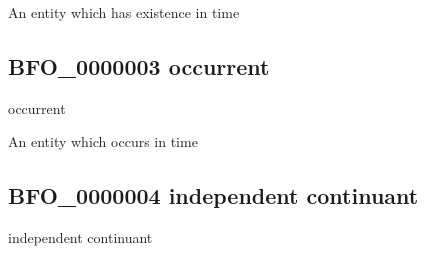 \documentclass[letterpaper,10pt,english]{sphinxmanual}
\begin{document}
\begin{sphinxShadowBox}

\sphinxAtStartPar
An entity which has existence in time
\end{sphinxShadowBox}

\begin{sphinxShadowBox}

\sphinxAtStartPar
{}
\end{sphinxShadowBox}
\begin{quote}

\ignorespaces \end{quote}


\subsection{BFO\_0000003 \sphinxhyphen{} occurrent}
\label{\detokenize{doc-BFO_0000003:bfo-0000003-occurrent}}\label{\detokenize{doc-BFO_0000003:index-0}}\label{\detokenize{doc-BFO_0000003::doc}}
\begin{sphinxShadowBox}

\sphinxAtStartPar
occurrent
\end{sphinxShadowBox}

\begin{sphinxShadowBox}

\sphinxAtStartPar
An entity which occurs in time
\end{sphinxShadowBox}

\begin{sphinxShadowBox}

\sphinxAtStartPar
{}
\end{sphinxShadowBox}
\begin{quote}

\ignorespaces \end{quote}


\subsection{BFO\_0000004 \sphinxhyphen{} independent continuant}
\label{\detokenize{doc-BFO_0000004:bfo-0000004-independent-continuant}}\label{\detokenize{doc-BFO_0000004:index-0}}\label{\detokenize{doc-BFO_0000004::doc}}
\begin{sphinxShadowBox}

\sphinxAtStartPar
independent continuant
\end{sphinxShadowBox}
\end{document}
